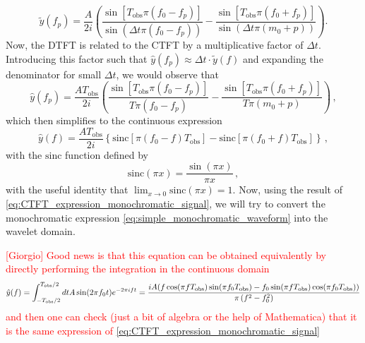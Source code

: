 \documentclass{article}
\begin{document}

\begin{equation}
\tilde{y}(f_{p}) = \frac{A}{2i}\left(\frac{\sin[T_{\text{obs}}\pi(f_{0} - f_{p})]}{\sin\left(\Delta t \pi (f_{0} - f_{p})\right)} - \frac{\sin[T_{\text{obs}} \pi(f_{0} + f_{p})]}{\sin\left(\Delta t \pi(m_{0} + p)\right)}\right).
\end{equation}
Now, the DTFT is related to the CTFT by a multiplicative factor of $\Delta t$. Introducing this factor such that $\hat{y}(f_{p}) \approx \Delta t \cdot \tilde{y}(f)$ and expanding the denominator for small $\Delta t$, we would observe that 
\begin{equation}\label{eq:CTFT_expression}
\hat{y}(f_{p}) = \frac{A T_{\text{obs}}}{2i}\left(\frac{\sin[T_{\text{obs}}\pi(f_{0} - f_{p})]}{T\pi (f_{0} - f_{p})} - \frac{\sin[T_{\text{obs}} \pi(f_{0} + f_{p})]}{T \pi(m_{0} + p)}\right)\, ,
\end{equation}
which then simplifies to the continuous expression 
\begin{equation}
\label{eq:CTFT_expression_monochromatic_signal}
\hat{y}(f) = \frac{A T_\text{obs}}{2i}\left\{\text{sinc}[\pi(f_{0} - f)T_{\text{obs}}] - \text{sinc}[\pi(f_{0} + f)T_{\text{obs}} ]\right\}\,,
\end{equation}
with the $\text{sinc}$ function defined by 
\begin{equation}
    \text{sinc}(\pi x) = \frac{\sin (\pi x)}{\pi x }\, ,
\end{equation}
with the useful identity that $\lim_{x \rightarrow 0} \text{sinc}(\pi x) = 1$. Now, using the result of \eqref{eq:CTFT_expression_monochromatic_signal}, we will try to convert the monochromatic expression \eqref{eq:simple_monochromatic_waveform} into the wavelet domain. 

\textcolor{red}{
[Giorgio] Good news is that this equation can be obtained equivalently by directly performing the integration in the continuous domain
%
\begin{align}
\hat y(f)=\int_{-T_{\rm obs}/2}^{T_{\rm obs}/2} dt A\sin(2\pi f_0 t) e^{-2\pi i f t}=\frac{i A (f \cos (\pi  f T_\text{obs}) \sin (\pi f_0 T_\text{obs})-f_0 \sin (\pi  f T_\text{obs}) \cos (\pi  f_0 T_\text{obs}))}{\pi  \left(f^2-f_0^2\right)}
\end{align}
%
and then one can check (just a bit of algebra or the help of Mathematica) that it is the same expression of \ref{eq:CTFT_expression_monochromatic_signal}
}
\end{document}
